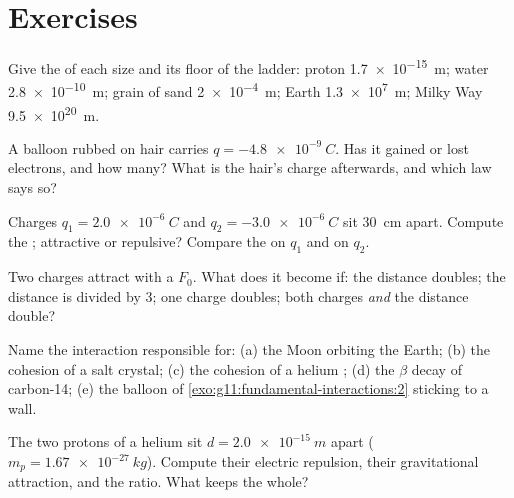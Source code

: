 \section{Exercises}

\begin{exercise}[$\star$]\label{exo:g11:fundamental-interactions:1}
Give the  of each size and its floor of the ladder:
proton \qty{1.7e-15}{m}; water  \qty{2.8e-10}{m}; grain of sand
\qty{2e-4}{m}; Earth \qty{1.3e7}{m}; Milky Way \qty{9.5e20}{m}.
\end{exercise}

\begin{exercise}[$\star$]\label{exo:g11:fundamental-interactions:2}
A balloon rubbed on hair carries $q = \qty{-4.8e-9}{C}$. Has it gained
or lost electrons, and how many? What is the hair's charge afterwards,
and which law says so?
\end{exercise}

\begin{exercise}[$\star$]\label{exo:g11:fundamental-interactions:3}
Charges $q_1 = \qty{+2.0e-6}{C}$ and $q_2 = \qty{-3.0e-6}{C}$ sit
\qty{30}{cm} apart. Compute the ; attractive or repulsive?
Compare the  on $q_1$ and on $q_2$.
\end{exercise}

\begin{exercise}[$\star$]\label{exo:g11:fundamental-interactions:4}
Two charges attract with a  $F_0$. What does it become if: the
distance doubles; the distance is divided by $3$; one charge doubles;
both charges \emph{and} the distance double?
\end{exercise}

\begin{exercise}[$\star$]\label{exo:g11:fundamental-interactions:5}
Name the interaction responsible for: (a) the Moon orbiting the Earth;
(b) the cohesion of a salt crystal; (c) the cohesion of a helium
; (d) the $\beta$ decay of carbon-14; (e) the balloon of
\cref{exo:g11:fundamental-interactions:2} sticking to a wall.
\end{exercise}

\begin{exercise}[$\star\star$]\label{exo:g11:fundamental-interactions:6}
The two protons of a helium  sit $d = \qty{2.0e-15}{m}$ apart
($m_p = \qty{1.67e-27}{kg}$). Compute their electric repulsion, their
gravitational attraction, and the ratio. What keeps the  whole?
\end{exercise}

